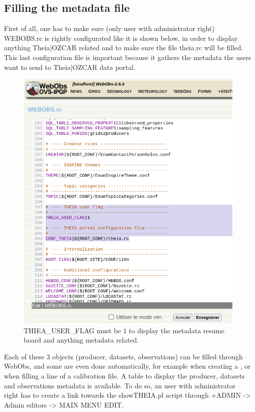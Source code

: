 \subsection{Filling the metadata file}

First of all, one has to make sure (only user with administrator right) WEBOBS.rc is rightly configurated like it is shown below, in order to display anything Theia|OZCAR related and to make sure the file theia.rc will be filled. This last configuration file is important because it gathers the metadata the users want to send to Theia|OZCAR data portal.

\begin{figure}[!h]
	\centering
	\includegraphics[width=\textwidth]{figures/webobs.rc.png}
	\caption{THIEA_USER_FLAG must be $1$ to display the metadata resume board and anything metadata related.}
	\label{webobs.rc}
\end{figure}

Each of these 3 objects (producer, datasets, observations) can be filled through WebObs, and some are even done automatically, for example when creating a , or when filling a line of a calibration file. A table to display the producer, datasets and observations metadata is available. To do so, an user with administrator right has to create a link towards the showTHEIA.pl script through +ADMIN -> Admin editors -> MAIN MENU EDIT. 

